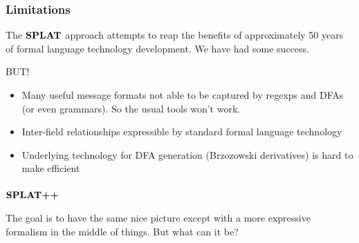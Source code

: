\documentclass{beamer}
\newcommand{\konst}[1]{\ensuremath{\mbox{\bf{#1}}}}
\begin{document}
\begin{frame}\frametitle{Limitations}

The \konst{SPLAT} approach attempts to reap the benefits of
approximately 50 years of formal language technology development. We
have had some success.

\vspace*{5mm}

BUT!

\begin{itemize}
 \item Many useful message formats not able to be captured by regexps
   and DFAs (or even grammars). So the usual tools won't work.
\vspace*{5mm}
 \item Inter-field relationships expressible by standard formal language technology
\vspace*{5mm}
 \item Underlying technology for DFA generation (Brzozowski derivatives) is hard to make efficient
\end{itemize}

\end{frame}


\begin{frame}\frametitle{\konst{SPLAT++}}

The goal is to have the same nice picture except with a more
expressive formalism in the middle of things. But what can it be?

\vspace*{10mm}

\end{frame}
\end{document}
